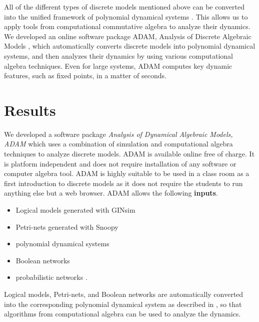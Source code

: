 \documentclass[11pt]{amsart}
\begin{document}
All of the  different types of discrete models mentioned above can be converted into the unified framework of polynomial dynamical systems \cite{Alan:Bioinf2010, Hinkelmann:2010}. This allows us to apply tools from computational commutative algebra to analyze their dynamics. We developed an online software package ADAM, Analysis of Discrete Algebraic Models \cite{ADAM}, which automatically converts discrete models into polynomial dynamical
systems, and then analyzes their dynamics by using various computational algebra techniques. Even for large systems, ADAM
computes key dynamic features, such as fixed points, in a matter of seconds.

\section{Results}
We developed a software package {\it Analysis of Dynamical Algebraic Models,
ADAM} \cite{ADAM} which uses a combination of simulation
and computational algebra techniques to analyze discrete models.
ADAM is available online free of charge. It is platform
independent and does not require installation of any software or computer
algebra tool. ADAM is highly suitable to be used in a class room as a first
introduction to discrete models as it does not require the students to run
anything else but a web browser.
ADAM allows the following {\bf inputs}.
\begin{itemize}
  \item Logical models generated with GINsim \cite{GINsim}
  \item Petri-nets generated with Snoopy \cite{Snoopy}
  \item polynomial dynamical systems
  \item Boolean networks
  \item probabilistic networks \cite{shmulevich}.
\end{itemize}
Logical models, Petri-nets, and Boolean networks are automatically converted
into the corresponding polynomial dynamical system as described in
\cite{Alan:Bioinf2010}, so that algorithms from computational
algebra can be used to analyze the dynamics.
\end{document}
